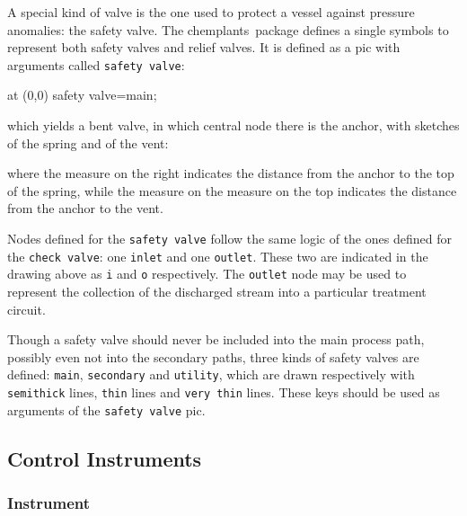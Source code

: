\documentclass[12pt]{article}						%
\newcommand*{\chpn}[1]{\texttt{#1}}				%
\newcommand*{\chpp}[1]{\texttt{#1}}				%
\newcommand*{\chpa}[1]{\texttt{#1}}				%
\newcommand*{\chemplants}{chemplants}
\begin{document}
A special kind of valve is the one used to protect a vessel against pressure
anomalies: the safety valve. The \chemplants\ package defines a single symbols to
represent both safety valves and relief valves. It is defined as a pic with
arguments called \chpp{safety valve}:
\begin{chpcode}
	\pic at (0,0) {safety valve=main};
\end{chpcode}
which yields a bent valve, in which central node there is the anchor, with
sketches of the spring and of the vent:
\begin{center}
\end{center}
where the measure on the right indicates the distance from the anchor to the top
of the spring, while the measure on the measure on the top indicates the distance
from the anchor to the vent.

Nodes defined for the \chpp{safety valve} follow the same logic of the ones
defined for the \chpp{check valve}: one \chpn{inlet} and one \chpn{outlet}.
These two are indicated in the drawing above as \chpn{i} and \chpn{o}
respectively. The \chpn{outlet} node may be used to represent the collection of
the discharged stream into a particular treatment circuit.

Though a safety valve should never be included into the main process path,
possibly even not into the secondary paths, three kinds of safety valves are
defined: \chpa{main}, \chpa{secondary} and \chpa{utility}, which are drawn
respectively with \verb|semithick| lines, \verb|thin| lines and \verb|very thin|
lines. These keys should be used as arguments of the \chpp{safety valve} pic.

\subsection{Control Instruments}

\subsubsection{Instrument}
\end{document}
